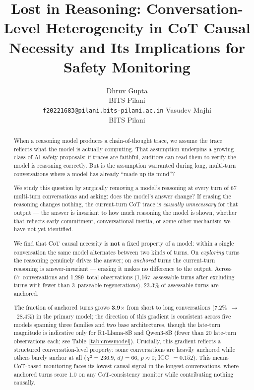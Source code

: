 \documentclass{article}
\title{Lost in Reasoning: Conversation-Level Heterogeneity in CoT
       Causal Necessity and Its Implications for Safety Monitoring}
\author{%
  Dhruv Gupta \\
  BITS Pilani \\
  \texttt{f20221683@pilani.bits-pilani.ac.in}
  \And
  Vasudev Majhi \\
  BITS Pilani \\
}
\begin{document}
\maketitle

\begin{abstract}
When a reasoning model produces a chain-of-thought trace, we assume
the trace reflects what the model is actually computing.
That assumption underpins a growing class of AI safety proposals:
if traces are faithful, auditors can read them to verify the model
is reasoning correctly.
But is the assumption warranted during long, multi-turn conversations
where a model has already ``made up its mind''?

We study this question by surgically removing a model's reasoning
at every turn of 67 multi-turn conversations and asking: does
the model's answer change?
If erasing the reasoning changes nothing, the current-turn CoT
trace is \emph{causally unnecessary} for that output --- the answer
is invariant to how much reasoning the model is shown, whether
that reflects early commitment, conversational inertia, or some
other mechanism we have not yet identified.

We find that CoT causal necessity is \textbf{not} a fixed property
of a model: within a single conversation the same model alternates
between two kinds of turns.
On \emph{exploring} turns the reasoning genuinely drives the answer;
on \emph{anchored} turns the current-turn reasoning is
answer-invariant --- erasing it makes no difference to the output.
Across 67~conversations and 1,289~total observations
(1,167~assessable turns after excluding turns with fewer than
3~parseable regenerations), 23.3\% of assessable turns are anchored.

The fraction of anchored turns grows \textbf{3.9$\times$} from
short to long conversations (7.2\%~$\to$~28.4\%) in the primary model;
the direction of this gradient is consistent across five models
spanning three families and two base architectures, though the
late-turn magnitude is indicative only for R1-Llama-8B and
Qwen3-8B (fewer than 20 late-turn observations each;
see Table~\ref{tab:crossmodel}).
Crucially, this gradient reflects a structured conversation-level
property: some conversations are heavily anchored while others
barely anchor at all ($\chi^2 = 236.9$, $df=66$, $p\approx 0$;
ICC~$= 0.152$).
This means CoT-based monitoring faces its lowest causal signal
in the longest conversations, where anchored turns score 1.0 on
any CoT-consistency monitor while contributing nothing causally.
\end{abstract}
\end{document}
